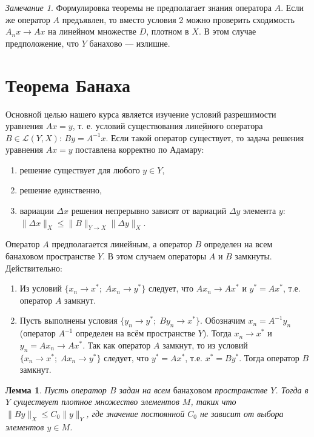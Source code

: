 \documentclass[12pt,a4paper,titlepage,oneside]{book}
\theoremstyle{definition}
\theoremstyle{plain}
\theoremstyle{break}
\theoremstyle{remark}
\newtheorem*{remark}{Замечание}
\theoremstyle{remark}
\theoremstyle{remark}
\theoremstyle{remark}
\theoremstyle{plain}
\newtheorem*{lemma}{Лемма}
\theoremstyle{plain}
\begin{document}
\begin{remark}
Формулировка теоремы не предполагает знания оператора $A$. Если же оператор $A$ предъявлен, то вместо условия 2 можно проверить сходимость $A_n x\to A x$ на линейном множестве $D$, плотном в $X$. В этом случае предположение, что $Y$ банахово --- излишне.
\end{remark}

\section{Теорема Банаха}
Основной целью нашего курса является изучение условий разрешимости уравнения $Ax=y$, т. е. условий существования $\underbar {линейного}$ оператора $B\in \mathcal{L}(Y, X)$: $By=A^{-1}x$. Если такой оператор существует, то задача решения уравнения $Ax=y$ поставлена корректно по Адамару:
\begin{enumerate}
	\item решение существует для любого $y \in Y$,
	\item решение единственно,
	\item вариации $\Delta x$ решения непрерывно зависят от вариаций $\Delta y$ элемента $y$: $\lVert \Delta x\rVert_X \leqslant \lVert B\rVert_{Y\to X}\lVert \Delta y\rVert_X$.
\end{enumerate}
Оператор $A$ предполагается линейным, а оператор $B$ определен на всем банаховом пространстве $Y$. В этом случаем операторы $A$ и $B$ замкнуты. Действительно:
\begin{enumerate}

	\item Из условий $\lbrace x_n \to x^{*}; \; Ax_n \to y^{*} \rbrace$ следует, что $Ax_n \to Ax^{*}$ и $y^{*}=Ax^{*}$, т.е. оператор $A$ замкнут.

	\item Пусть выполнены условия $\lbrace y_n \to y^{*}; \; By_n \to x^{*} \rbrace$. Обозначим $x_n=A^{-1}y_n$ (оператор $A^{-1}$ определен на всём пространстве $Y$). Тогда $x_n \to x^{*}$ и $y_n=Ax_n \to Ax^{*}$. Так как оператор $A$ замкнут, то из условий $\lbrace x_n \to x^{*}; \; Ax_n \to y^{*} \rbrace$ следует, что $y^{*}=Ax^{*}$, т.е. $x^{*}=By^{*}$. Тогда оператор $B$ замкнут.
	
\end{enumerate}
	
\begin{lemma}
Пусть оператор $B$ задан на всем $\underbar {банаховом}$ пространстве $Y$. Тогда в $Y$ существует плотное множество элементов $M$, таких что $\lVert By\rVert_X \leqslant C_0\lVert y\rVert_Y $, где значение постоянной $C_0$ не зависит от выбора элементов $y \in M$.
\end{lemma}
\end{document}
